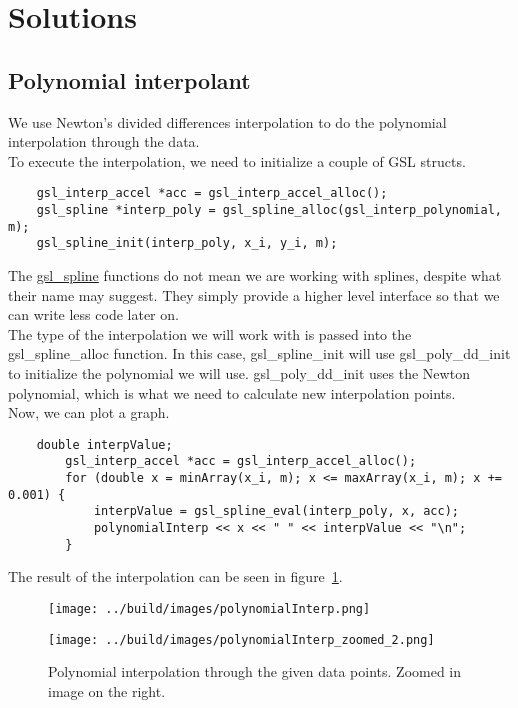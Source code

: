 \documentclass[11pt, a4paper, titlepage, openright]{article}
\begin{document}
\newpage
\section{Solutions}

\subsection{Polynomial interpolant}
\label{sec:firstpoly}
    We use Newton's divided differences interpolation to do the polynomial interpolation through the data. \\

    To execute the interpolation, we need to initialize a couple of GSL structs.
    \begin{lstlisting}
    gsl_interp_accel *acc = gsl_interp_accel_alloc();
    gsl_spline *interp_poly = gsl_spline_alloc(gsl_interp_polynomial, m);
    gsl_spline_init(interp_poly, x_i, y_i, m);
    \end{lstlisting}
    The \href{https://www.gnu.org/software/gsl/manual/html_node/1D-Higher_002dlevel-Interface.html#g_t1D-Higher_002dlevel-Interface}
    {gsl\_spline} functions do not mean we are working with splines, despite what their name may suggest.
    They simply provide a higher level interface so that we can write less code later on. \\ The type of the interpolation
    we will work with is passed into the gsl\_spline\_alloc function. In this case, gsl\_spline\_init  will
    use gsl\_poly\_dd\_init to initialize the polynomial we will use. gsl\_poly\_dd\_init uses the Newton polynomial,
    which is what we need to calculate new interpolation points. \\

    Now, we can plot a graph.
    \begin{lstlisting}
    double interpValue;
        gsl_interp_accel *acc = gsl_interp_accel_alloc();
        for (double x = minArray(x_i, m); x <= maxArray(x_i, m); x += 0.001) {
            interpValue = gsl_spline_eval(interp_poly, x, acc);
            polynomialInterp << x << " " << interpValue << "\n";
        }
    \end{lstlisting}
    The result of the interpolation can be seen in figure~\ref{fig:poly1}.


    \begin{figure}[H]
        \begin{minipage}[b]{0.49\textwidth}
            \texttt{[image: ../build/images/polynomialInterp.png]}
        \end{minipage}
        \hfill
        \begin{minipage}[b]{0.49\textwidth}
            \texttt{[image: ../build/images/polynomialInterp\_zoomed\_2.png]}
        \end{minipage}
        \caption{Polynomial interpolation through the given data points. Zoomed in image on the right.}
        \label{fig:poly1}
    \end{figure}
\end{document}
